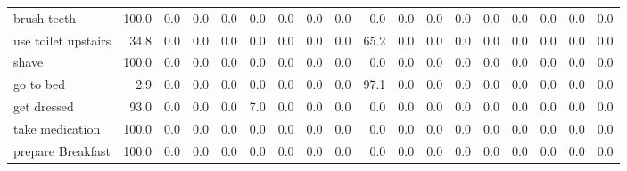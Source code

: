 \documentclass{article}
\begin{document}
\begin{sideways}
\begin{tabular}{lrrrrrrrrrrrrrrrrr}
brush teeth           &       100.0 &                0.0 &           0.0 &                          0.0 &                0.0 &                0.0 &                        0.0 &          0.0 &              0.0 &                0.0 &                    0.0 &                      0.0 &                  0.0 &                   0.0 &              0.0 &              0.0 &          0.0 \\
use toilet upstairs   &        34.8 &                0.0 &           0.0 &                          0.0 &                0.0 &                0.0 &                        0.0 &          0.0 &             65.2 &                0.0 &                    0.0 &                      0.0 &                  0.0 &                   0.0 &              0.0 &              0.0 &          0.0 \\
shave                 &       100.0 &                0.0 &           0.0 &                          0.0 &                0.0 &                0.0 &                        0.0 &          0.0 &              0.0 &                0.0 &                    0.0 &                      0.0 &                  0.0 &                   0.0 &              0.0 &              0.0 &          0.0 \\
go to bed             &         2.9 &                0.0 &           0.0 &                          0.0 &                0.0 &                0.0 &                        0.0 &          0.0 &             97.1 &                0.0 &                    0.0 &                      0.0 &                  0.0 &                   0.0 &              0.0 &              0.0 &          0.0 \\
get dressed           &        93.0 &                0.0 &           0.0 &                          0.0 &                7.0 &                0.0 &                        0.0 &          0.0 &              0.0 &                0.0 &                    0.0 &                      0.0 &                  0.0 &                   0.0 &              0.0 &              0.0 &          0.0 \\
take medication       &       100.0 &                0.0 &           0.0 &                          0.0 &                0.0 &                0.0 &                        0.0 &          0.0 &              0.0 &                0.0 &                    0.0 &                      0.0 &                  0.0 &                   0.0 &              0.0 &              0.0 &          0.0 \\
prepare Breakfast     &       100.0 &                0.0 &           0.0 &                          0.0 &                0.0 &                0.0 &                        0.0 &          0.0 &              0.0 &                0.0 &                    0.0 &                      0.0 &                  0.0 &                   0.0 &              0.0 &              0.0 &          0.0 \\

\end{tabular}
\end{sideways}
\end{document}
